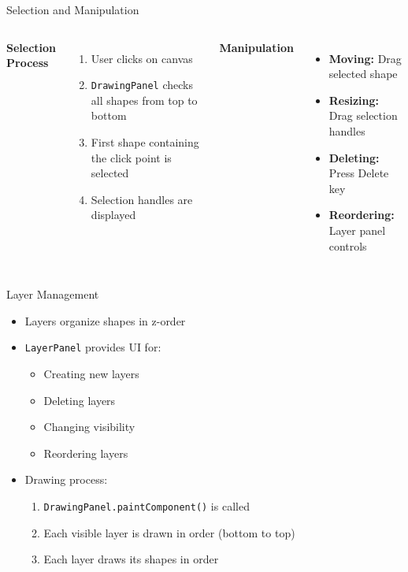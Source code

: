 \documentclass{beamer}
\begin{document}
\begin{frame}{Selection and Manipulation}
\begin{columns}
\textbf{Selection Process}
\begin{enumerate}
\item User clicks on canvas
\item \texttt{DrawingPanel} checks all shapes from top to bottom
\item First shape containing the click point is selected
\item Selection handles are displayed
\end{enumerate}

\textbf{Manipulation}
\begin{itemize}
\item \textbf{Moving:} Drag selected shape
\item \textbf{Resizing:} Drag selection handles
\item \textbf{Deleting:} Press Delete key
\item \textbf{Reordering:} Layer panel controls
\end{itemize}
\end{columns}
\end{frame}

\begin{frame}{Layer Management}
\begin{itemize}
\item Layers organize shapes in z-order
\item \texttt{LayerPanel} provides UI for:
  \begin{itemize}
  \item Creating new layers
  \item Deleting layers
  \item Changing visibility
  \item Reordering layers
  \end{itemize}
\item Drawing process:
  \begin{enumerate}
  \item \texttt{DrawingPanel.paintComponent()} is called
  \item Each visible layer is drawn in order (bottom to top)
  \item Each layer draws its shapes in order
  \end{enumerate}
\end{itemize}
\end{frame}
\end{document}
